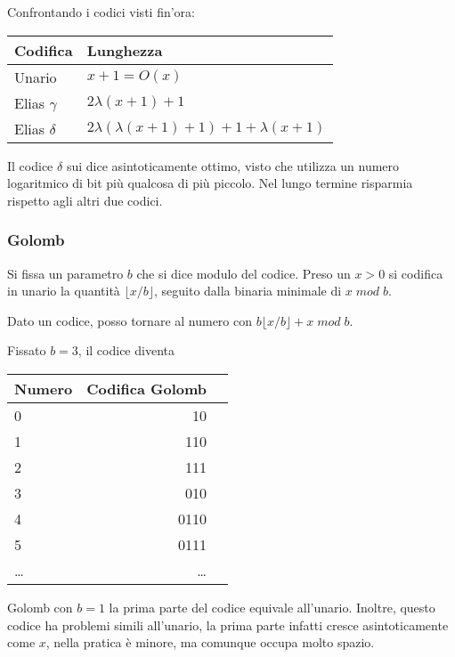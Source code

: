 Confrontando i codici visti fin'ora: 
\begin{center}
    \begin{tabular}{|l | l |}
        \hline
        Codifica & Lunghezza\\
        \hline
        Unario & $x+1 = O(x)$\\
        Elias $\gamma$ & $2\lambda (x+1) + 1$\\
        Elias $\delta$ & $2\lambda (\lambda (x+1) + 1) + 1 + \lambda(x+1)$\\ 
        \hline
    \end{tabular}
\end{center}

Il codice $\delta$ sui dice asintoticamente ottimo, visto che utilizza 
un numero logaritmico di bit più qualcosa di più piccolo. 
Nel lungo termine risparmia rispetto agli altri due codici.

\subsubsection{Golomb}

Si fissa un parametro $b$ che si dice modulo del codice. Preso un 
$x > 0$ si codifica in unario la quantità $\lfloor x/ b \rfloor$, 
seguito dalla binaria minimale di $x\;\textit{mod}\;b$.

Dato un codice, posso tornare al numero con $b\lfloor x/ b \rfloor + x\;\textit{mod}\;b$.

Fissato $b = 3$, il codice diventa 

\begin{center}
    \begin{tabular}{|l | r | r |}
        \hline
        Numero & Codifica Golomb \\
        \hline
        0 & 10\\
        1 & 110\\
        2 & 111\\ 
        3 & 010\\ 
        4 & 0110\\ 
        5 & 0111\\ 
        \dots & \dots\\
        \hline
    \end{tabular}
\end{center}

\begin{remark}
    Golomb con $b = 1$ la prima parte del codice equivale all'unario. Inoltre, questo codice ha problemi simili all'unario, 
    la prima parte infatti cresce asintoticamente come $x$, 
    nella pratica è minore, ma comunque occupa molto spazio. 
\end{remark}

